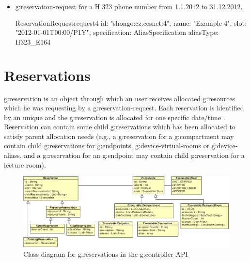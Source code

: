\begin{itemize}
\item \Gls{g:reservation-request} for a H.323 phone number from 1.1.2012 to 31.12.2012.

\label{oc:request4}
\begin{ObjectCode}{ReservationRequest}{request4}{}
id: "shongo:cz.cesnet:4",
name: "Example 4",
slot: "2012-01-01T00:00/P1Y",
specification: AliasSpecification {
  aliasType: H323_E164
}
\end{ObjectCode}

\end{itemize}


\section{Reservations}

\Gls{g:reservation} is an object through which an user receives allocated \glspl{g:resource} which he was requesting by a \gls{g:reservation-request}. Each reservation is identified by an unique  and the \gls{g:reservation} is allocated for one specific date/time . Reservation can contain some child \glspl{g:reservation} which has been allocated to satisfy parent allocation needs (e.g., a \gls{g:reservation} for a \gls{g:compartment} may contain child \glspl{g:reservation} for \glspl{g:endpoint}, \glspl{g:device-virtual-room} or \glspl{g:device-alias}, and a \gls{g:reservation} for an \gls{g:endpoint} may contain child \gls{g:reservation} for a lecture room).

\begin{figure}[ht!]
\includegraphics[width=\textwidth]{diagrams/cd_api_reservations}
\caption{Class diagram for \glspl{g:reservation} in the \gls{g:controller} API}
\label{fig:cd_api_reservations}
\end{figure}

